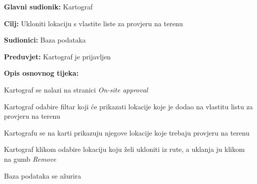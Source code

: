 					\noindent {} %
					\begin{packed_item}
	
						\item \textbf{Glavni sudionik: }Kartograf
						\item  \textbf{Cilj:} Ukloniti lokaciju s vlastite liste za provjeru na terenu
						\item  \textbf{Sudionici:} Baza podataka
						\item  \textbf{Preduvjet:} Kartograf je prijavljen
						\item  \textbf{Opis osnovnog tijeka:}
						
						\item[] \begin{packed_enum}
	
							\item Kartograf se nalazi na stranici \textit{On-site approval}
							\item Kartograf odabire filtar koji će prikazati lokacije koje je dodao na vlastitu listu za provjeru na terenu
							\item Kartografu se na karti prikazuju njegove lokacije koje trebaju provjeru na terenu
							\item Kartograf klikom odabire lokaciju koju želi ukloniti iz rute, a uklanja ju klikom na gumb \textit{Remove}
							\item Baza podataka se ažurira

						\end{packed_enum}
						
					\end{packed_item}
					
